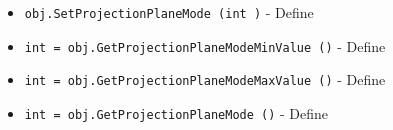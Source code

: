 \begin{itemize}
\item  \verb|obj.SetProjectionPlaneMode (int )| -  Define

\item  \verb|int = obj.GetProjectionPlaneModeMinValue ()| -  Define

\item  \verb|int = obj.GetProjectionPlaneModeMaxValue ()| -  Define

\item  \verb|int = obj.GetProjectionPlaneMode ()| -  Define

\end{itemize}
